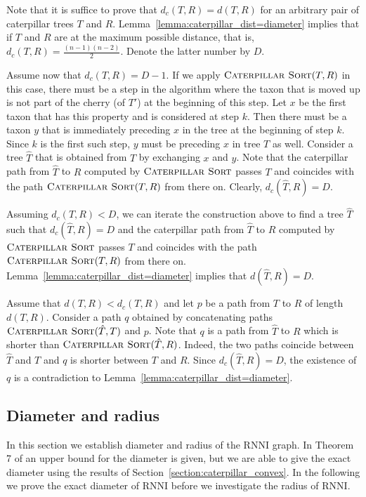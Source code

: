 \documentclass{amsart}
\newcommand{\rnni}{\mathrm{RNNI}}
\newcommand{\csort}{\textsc{Caterpillar Sort}}
\begin{document}
\proof
Note that it is suffice to prove that $d_c(T, R) = d(T, R)$ for an arbitrary pair of caterpillar trees $T$ and $R$.
Lemma~\ref{lemma:caterpillar_dist=diameter} implies that if $T$ and $R$ are at the maximum possible distance, that is, $d_c(T, R) = \frac{(n-1)(n-2)}{2}$.
Denote the latter number by $D$.

Assume now that $d_c(T, R) = D - 1$.
If we apply $\csort(T, R)$ in this case, there must be a step in the algorithm where the taxon that is moved up is not part of the cherry (of $T'$) at the beginning of this step.
Let $x$ be the first taxon that has this property and is considered at step $k$.
Then there must be a taxon $y$ that is immediately preceding $x$ in the tree at the beginning of step $k$.
Since $k$ is the first such step, $y$ must be preceding $x$ in tree $T$ as well.
Consider a tree $\hat T$ that is obtained from $T$ by exchanging $x$ and $y$.
Note that the caterpillar path from $\hat T$ to $R$ computed by $\csort$ passes $T$ and coincides with the path $\csort(T, R)$ from there on.
Clearly, $d_c(\hat T, R) = D$.

Assuming $d_c(T, R) < D$, we can iterate the construction above to find a tree $\hat T$ such that $d_c(\hat T, R) = D$ and the caterpillar path from $\hat T$ to $R$ computed by $\csort$ passes $T$ and coincides with the path $\csort(T, R)$ from there on.
Lemma~\ref{lemma:caterpillar_dist=diameter} implies that $d(\hat T, R) = D$.

Assume that $d(T, R) < d_c(T, R)$ and let $p$ be a path from $T$ to $R$ of length $d(T, R)$.
Consider a path $q$ obtained by concatenating paths $\csort(\hat T, T)$ and $p$.
Note that $q$ is a path from $\hat T$ to $R$ which is shorter than $\csort(\hat T, R)$.
Indeed, the two paths coincide between $\hat T$ and $T$ and $q$ is shorter between $T$ and $R$.
Since $d_c(\hat T, R) = D$, the existence of $q$ is a contradiction to Lemma~\ref{lemma:caterpillar_dist=diameter}.
\endproof


\subsection{Diameter and radius}
\label{section:diameter}

In this section we establish diameter and radius of the $\rnni$ graph.
In Theorem 7 of \autocite{Gavryushkin2018-ol} an upper bound for the diameter is given, but we are able to give the exact diameter using the results of Section~\ref{section:caterpillar_convex}.
In the following we prove the exact diameter of $\rnni$ before we investigate the radius of $\rnni$.
\end{document}
